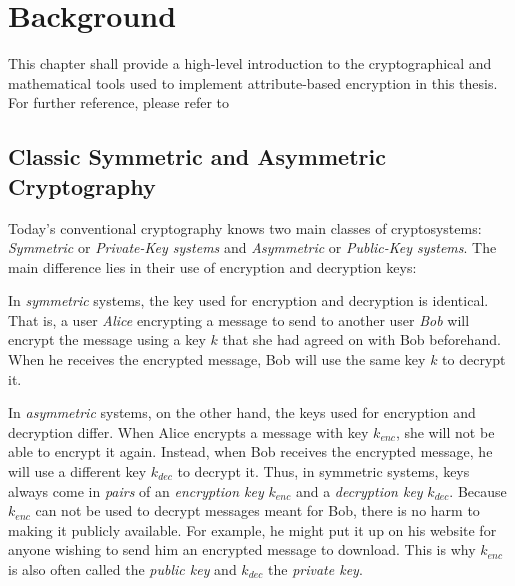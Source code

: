 \chapter{Background}\label{chapter:background}
This chapter shall provide a high-level introduction to the cryptographical and mathematical tools used to implement attribute-based encryption in this thesis. For further reference, please refer to %


\section{Classic Symmetric and Asymmetric Cryptography}
Today's conventional cryptography knows two main classes of cryptosystems: \emph{Symmetric} or \emph{Private-Key systems} and \emph{Asymmetric} or \emph{Public-Key systems}.
The main difference lies in their use of encryption and decryption keys:

In \emph{symmetric} systems, the key used for encryption and decryption is identical.
That is, a user \emph{Alice} encrypting a message to send to another user \emph{Bob} will encrypt the message using a key $k$ that she had agreed on with Bob beforehand.
When he receives the encrypted message, Bob will use the same key $k$ to decrypt it.

In \emph{asymmetric} systems, on the other hand, the keys used for encryption and decryption differ.
When Alice encrypts a message with key $k_{enc}$, she will not be able to encrypt it again.
Instead, when Bob receives the encrypted message, he will use a different key $k_{dec}$ to decrypt it.
Thus, in symmetric systems, keys always come in \emph{pairs} of an \emph{encryption key} $k_{enc}$ and a \emph{decryption key} $k_{dec}$.
Because $k_{enc}$ can not be used to decrypt messages meant for Bob, there is no harm to making it publicly available.
For example, he might put it up on his website for anyone wishing to send him an encrypted message to download. This is why $k_{enc}$ is also often called the \emph{public key} and $k_{dec}$ the \emph{private key}.

